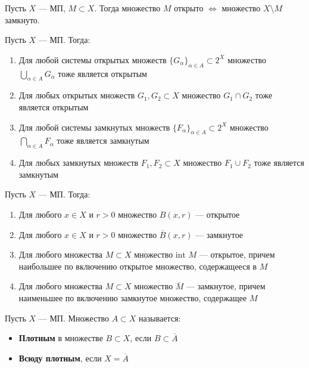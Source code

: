 \begin{theorem}
	Пусть $X$ — МП, $M \subset X$. Тогда множество $M$ открыто $\Leftrightarrow$ множество $X \setminus M$ замкнуто.
\end{theorem}

\begin{theorem}
	Пусть $X$ — МП. Тогда:
	\begin{enumerate}
		\item Для любой системы открытых множеств $\{G_\alpha\}_{\alpha \in A} \subset 2^X$ множество $\bigcup_{\alpha \in A} G_\alpha$ тоже является открытым
		\item Для любых открытых множеств $G_1, G_2 \subset X$ множество $G_1 \cap G_2$ тоже является открытым
		\item Для любой системы замкнутых множеств $\{F_\alpha\}_{\alpha \in A} \subset 2^X$ множество $\bigcap_{\alpha \in A} F_\alpha$ тоже является замкнутым
		\item Для любых замкнутых множеств $F_1, F_2 \subset X$ множество $F_1 \cup F_2$ тоже является замкнутым
	\end{enumerate}

\end{theorem}

\begin{theorem}
	Пусть $X$ — МП. Тогда:
	\begin{enumerate}
		\item Для любого $x \in X$ и $r > 0$ множество $B(x, r)$ — открытое
		\item Для любого $x \in X$ и $r > 0$ множество $\overline{B}(x, r)$ — замкнутое
		\item Для любого множества $M \subset X$ множество $\text{int } M$ — открытое, причем наибольшее по включению открытое множество, содержащееся в $M$
		\item Для любого множества $M \subset X$ множество $\overline{M}$ — замкнутое, причем наименьшее по включению замкнутое множество, содержащее $M$
	\end{enumerate}
\end{theorem}

\begin{definition}[Плотность]
	Пусть $X$ — МП. Множество $A \subset X$ называется:
	\begin{itemize}
		\item \textbf{Плотным} в множестве $B \subset X$, если $B \subset \overline{A}$
		\item \textbf{Всюду плотным}, если $X = \overline{A}$
	\end{itemize}
\end{definition}

